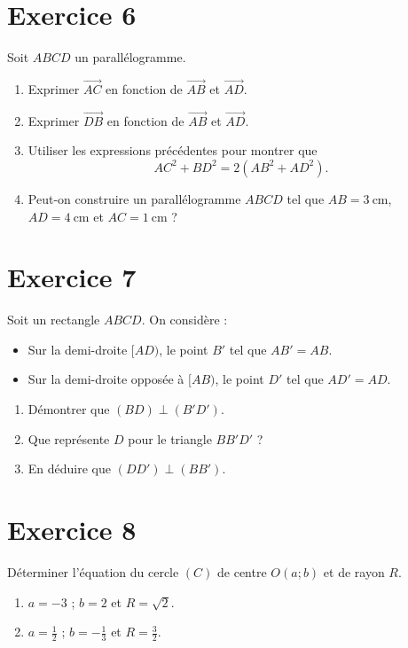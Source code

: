 \documentclass[12pt]{article}
\begin{document}
\section*{Exercice 6}

Soit $ABCD$ un parallélogramme.

\begin{enumerate}
    \item Exprimer $\overrightarrow{AC}$ en fonction de $\overrightarrow{AB}$ et $\overrightarrow{AD}$.

    \item Exprimer $\overrightarrow{DB}$ en fonction de $\overrightarrow{AB}$ et $\overrightarrow{AD}$.

    \item Utiliser les expressions précédentes pour montrer que 
    \[
    AC^2 + BD^2 = 2(AB^2 + AD^2).
    \]

    \item Peut-on construire un parallélogramme $ABCD$ tel que $AB = 3\ \text{cm}$, $AD = 4\ \text{cm}$ et $AC = 1\ \text{cm}$ ?
\end{enumerate}
\section*{Exercice 7}

Soit un rectangle $ABCD$. On considère :
\begin{itemize}
    \item Sur la demi-droite $[AD)$, le point $B'$ tel que $AB' = AB$.
    \item Sur la demi-droite opposée à $[AB)$, le point $D'$ tel que $AD' = AD$.
\end{itemize}
\begin{enumerate}
    \item Démontrer que $(BD) \perp (B'D')$.
    \item Que représente $D$ pour le triangle $BB'D'$ ?
    \item En déduire que $(DD') \perp (BB')$.
\end{enumerate}
\section*{Exercice 8}

Déterminer l’équation du cercle $(C)$ de centre $O(a; b)$ et de rayon $R$.
\begin{enumerate}
    \item $a = -3$ ; $b = 2$ et $R = \sqrt{2}$.
    \item $a = \frac{1}{2}$ ; $b = -\frac{1}{3}$ et $R = \frac{3}{2}$.
\end{enumerate}
\end{document}

